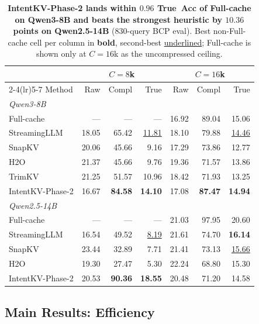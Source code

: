 \documentclass[11pt]{article}
\newcommand{\method}{IntentKV\xspace}
\newcommand{\learn}{Phase-2\xspace}
\begin{document}
\begin{table}[!htbp]
\centering
\footnotesize
\caption{\textbf{\method-\learn lands within $0.96$ True~Acc of
Full-cache on Qwen3-8B and beats the strongest heuristic by
$10.36$ points on Qwen2.5-14B} ($830$-query BCP eval). Best
non-Full-cache cell per column in \textbf{bold}, second-best
\underline{underlined}; Full-cache is shown only at $C{=}16$k as
the uncompressed ceiling.}
\label{tab:main-accuracy}
\setlength{\tabcolsep}{2pt}
\renewcommand{\arraystretch}{1.05}
\begin{tabular*}{\columnwidth}{@{\extracolsep{\fill}} @{}l rrr rrr@{}}
\toprule
 & \multicolumn{3}{c}{$C{=}8$k} & \multicolumn{3}{c}{$C{=}16$k} \\
\cmidrule(lr){2-4}\cmidrule(lr){5-7}
Method & Raw & Compl & True & Raw & Compl & True \\
\midrule
\multicolumn{7}{l}{\emph{Qwen3-8B}} \\
Full-cache    & ---   & ---   & ---   & 16.92 & 89.04 & 15.06 \\
StreamingLLM  & 18.05 & 65.42 & \underline{11.81}
              & 18.10 & 79.88 & \underline{14.46} \\
SnapKV        & 20.06 & 45.66 & 9.16
              & 17.29 & 73.86 & 12.77 \\
H2O           & 21.37 & 45.66 & 9.76
              & 19.36 & 71.57 & 13.86 \\
TrimKV        & 21.25 & 51.57 & 10.96
              & 18.42 & 71.93 & 13.25 \\
\method-\learn & 16.67 & \textbf{84.58} & \textbf{14.10}
               & 17.08 & \textbf{87.47} & \textbf{14.94} \\
\midrule
\multicolumn{7}{l}{\emph{Qwen2.5-14B}} \\
Full-cache    & ---   & ---   & ---   & 21.03 & 97.95 & 20.60 \\
StreamingLLM  & 16.54 & 49.52 & \underline{8.19}
              & 21.61 & 74.70 & \textbf{16.14} \\
SnapKV        & 23.44 & 32.89 & 7.71
              & 21.41 & 73.13 & \underline{15.66} \\
H2O           & 19.30 & 27.47 & 5.30
              & 22.24 & 68.80 & 15.30 \\
\method-\learn & 20.53 & \textbf{90.36} & \textbf{18.55}
               & 20.48 & 71.20 & 14.58 \\
\bottomrule
\end{tabular*}
\end{table}

\subsection{Main Results: Efficiency}
\label{sec:experiments-efficiency}
\end{document}
